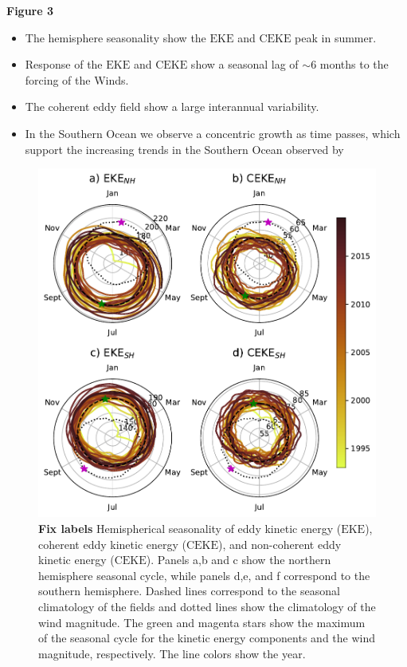 \documentclass[draft,linenumbers]{agujournal2019}
\newcommand{\EKE}{\textrm{EKE}}
\newcommand{\CEKE}{\textrm{CEKE}}
\begin{document}
	\textbf{Figure 3}
	\begin{itemize}
		\item The hemisphere seasonality show the  $\EKE$ and $\CEKE$ peak in summer.
		\item Response of the $\EKE$ and $\CEKE$ show a seasonal lag of $\sim$6 months to the forcing of the Winds.
		\item The coherent eddy field show a large interannual variability.
		\item In the Southern Ocean we observe a concentric growth as time passes, which support the increasing trends in the Southern Ocean observed by \citep{Hogg_Recent_2015,Martinez_Kinetic_2019,Martinez_Kinetic_2021}
	\end{itemize}

	\begin{figure}
	    \centering
	    \includegraphics[width=1\textwidth]{figures/All_polar_plots.pdf}
	    \caption{\textbf{Fix labels} Hemispherical seasonality of eddy kinetic energy ($\EKE$), coherent eddy kinetic energy ($\CEKE$), and non-coherent eddy kinetic energy ($\CEKE$). Panels a,b and c show the northern hemisphere seasonal cycle, while panels d,e, and f correspond to the southern hemisphere. Dashed lines correspond to the seasonal climatology of the fields and dotted lines show the climatology of the wind magnitude. The green and magenta stars show the maximum of the seasonal cycle for the kinetic energy components and the wind magnitude, respectively. The line colors show the year.}
	    \label{fig:eddy_energy_polar}
	\end{figure}
	
\end{document}
